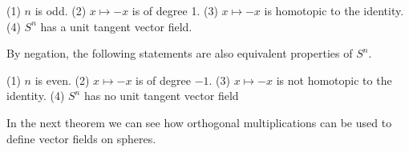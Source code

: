(1) $n$ is odd.
(2) $x \mapsto -x$ is of degree 1.
(3) $x \mapsto -x$ is homotopic to the identity.
(4) $S^n$ has a unit tangent vector field.

By negation, the following statements are also equivalent properties of $S^n$.

(1) $n$ is even.
(2) $x \mapsto -x$ is of degree $-1$.
(3) $x \mapsto -x$ is not homotopic to the identity.
(4) $S^n$ has no unit tangent vector field

In the next theorem we can see how orthogonal multiplications can be used to define vector fields on spheres.
